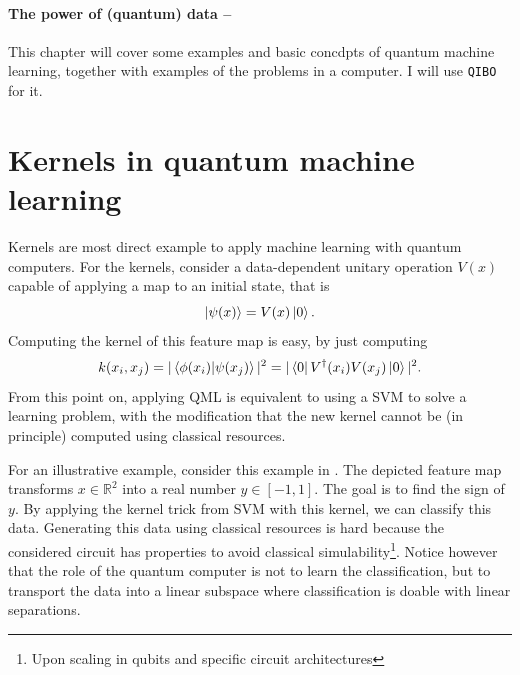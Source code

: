 \documentclass[]{report}
\begin{document}
\paragraph{The power of (quantum) data --}

This chapter will cover some examples and basic concdpts of quantum machine learning, together with examples of the problems in a computer. I will use {\tt QIBO} for it.  

\section{Kernels in quantum machine learning}

Kernels are most direct example to apply machine learning with quantum computers. For the kernels, consider a data-dependent unitary operation $V(x)$ capable of applying a map to an initial state, that is
\begin{equation}
\ket{\psi(x)} = V(x) \ket 0.
\end{equation}
Computing the kernel of this feature map is easy, by just computing
\begin{equation}
k(x_i, x_j) = \vert \braket{\phi(x_i)}{\psi(x_j)} \vert^2 = \vert \bra 0 V^\dagger (x_i) V(x_j) \ket 0 \vert^2.
\end{equation}
From this point on, applying QML is equivalent to using a SVM to solve a learning problem, with the modification that the new kernel cannot be (in principle) computed using classical resources. 

For an illustrative example, consider this example in  \cite{havlicek2019supervised}. The depicted feature map transforms $x \in \mathbb R^2$ into a real number $y \in [-1, 1]$. The goal is to find the sign of $y$. By applying the kernel trick from SVM with this kernel, we can classify this data. 
Generating this data using classical resources is hard because the considered circuit has properties to avoid classical simulability\footnote{Upon scaling in qubits and specific circuit architectures}. Notice however that the role of the quantum computer is not to learn the classification, but to transport the data into a linear subspace where classification is doable with linear separations. 
\end{document}
